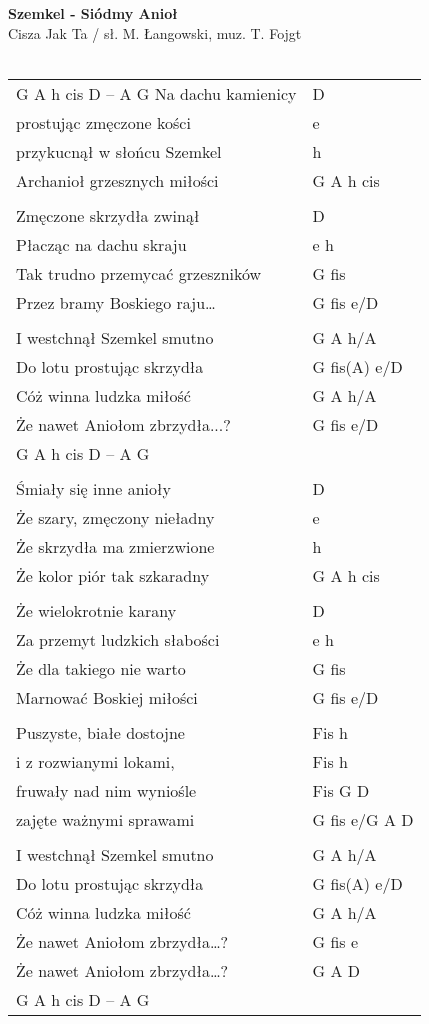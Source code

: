 \documentclass[a5paper]{article}
\begin{document}


\noindent
\fontsize{12pt}{15pt}\selectfont
\textbf{Szemkel - Siódmy Anioł} \\
\fontsize{8pt}{10pt}\selectfont
Cisza Jak Ta / sł. M. Łangowski, muz. T. Fojgt \\ \\
\fontsize{10pt}{12pt}\selectfont
{}
\begin{tabular}{@{}p{7.50cm}p{3cm}@{}}
\noindent
G A h cis D – A G
Na dachu kamienicy & D \\
prostując zmęczone kości & e \\
przykucnął w słońcu Szemkel & h \\
Archanioł grzesznych miłości & G A h cis \\ \\

Zmęczone skrzydła zwinął & D \\
Płacząc na dachu skraju & e h \\
Tak trudno przemycać grzeszników & G fis \\
Przez bramy Boskiego raju… & G fis e/D \\ \\

I westchnął Szemkel smutno & G A h/A \\
Do lotu prostując skrzydła & G fis(A) e/D \\
Cóż winna ludzka miłość & G A h/A \\
Że nawet Aniołom zbrzydła...? & G fis e/D \\
G A h cis D – A G & \\ \\

Śmiały się inne anioły & D \\
Że szary, zmęczony nieładny & e \\
Że skrzydła ma zmierzwione & h \\
Że kolor piór tak szkaradny & G A h cis \\ \\

Że wielokrotnie karany & D \\
Za przemyt ludzkich słabości & e h \\
Że dla takiego nie warto & G fis \\
Marnować Boskiej miłości & G fis e/D \\ \\

Puszyste, białe dostojne & Fis h \\
i z rozwianymi lokami, & Fis h \\
fruwały nad nim wyniośle & Fis G D \\
zajęte ważnymi sprawami & G fis e/G A D \\ \\

I westchnął Szemkel smutno & G A h/A \\
Do lotu prostując skrzydła & G fis(A) e/D \\
Cóż winna ludzka miłość & G A h/A \\
Że nawet Aniołom zbrzydła…? & G fis e \\
Że nawet Aniołom zbrzydła…? & G A D \\
G A h cis D – A G &
\end{tabular}
\end{document}

